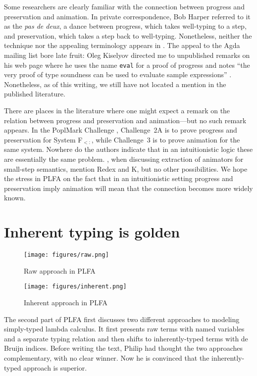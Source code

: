\documentclass[preprint,authoryear]{elsarticle}
\begin{document}
Some researchers are clearly familiar with the connection between
progress and preservation and animation.  In private correspondence,
Bob Harper referred to it as the \emph{pas de deux}, a dance between
progress, which takes well-typing to a step, and preservation, which
takes a step back to well-typing.  Nonetheless, neither the technique
nor the appealing terminology appears in \citet{Harper-2016}.  The
appeal to the Agda mailing list bore late fruit: Oleg Kiselyov
directed me to unpublished remarks on his web page where he uses the
name \texttt{eval} for a proof of progress and notes ``the very proof
of type soundness can be used to evaluate sample expressions''
\citep{Kiselyov-2009}.  Nonetheless, as of this writing, we still have
not located a mention in the published literature.

There are places in the literature where one might expect a remark on
the relation between progress and preservation and animation---but no
such remark appears.  In the PoplMark Challenge
\citep{Aydemir-et-al-2005}, Challenge~2A is to prove progress and
preservation for System F$_{<:}$, while Challenge~3 is to prove
animation for the same system. Nowhere do the authors indicate that in
an intuitionistic logic these are essentially the same problem.
\cite{Owens-et-al-2016}, when discussing extraction of animators for
small-step semantics, mention Redex and K, but no other possibilities.
We hope the stress in PLFA on the fact that in an intuitionistic
setting progress and preservation imply animation will mean that the
connection becomes more widely known.






\section{Inherent typing is golden}

\begin{figure}[p]
  \texttt{[image: figures/raw.png]}
  \caption{Raw approach in PLFA}
  \label{fig:raw}
\end{figure}

\begin{figure}[t]
  \texttt{[image: figures/inherent.png]}
  \caption{Inherent approach in PLFA}
  \label{fig:inherent}
\end{figure}

The second part of PLFA first discusses two different approaches to
modeling simply-typed lambda calculus.  It first presents raw
terms with named variables and a separate typing relation and
then shifts to inherently-typed terms with de Bruijn indices.
Before writing the text, Philip had thought the two approaches
complementary, with no clear winner.  Now he is convinced that the
inherently-typed approach is superior.
\end{document}
